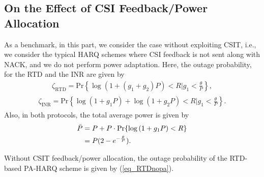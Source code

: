\subsection{On the Effect of CSI Feedback/Power Allocation}
As a benchmark, in this part, we consider the case without exploiting CSIT, i.e., we consider the typical HARQ schemes where CSI feedback is not sent along with NACK, and we do not perform power adaptation.  Here, the outage probability,  for the RTD and the INR  are given by
\begin{align}\label{eq_PrRTD}
    \zeta_{\text{RTD}} = \text{Pr}\left\{\log\left(1+\left(g_1+g_2\right)P\right)<R\Big|g_1<\frac{\theta}{P}  \right\},
\end{align}
\begin{align}\label{eq_PrINR}
\begin{split}
    \zeta_{\text{INR}}=\text{Pr}\left\{\log\left(1+g_1P\right) + \log\left(1+g_2P\right)<R\Big|g_1<\frac{\theta}{P}\right\}.
\end{split}
\end{align}
Also, in both protocols, the total average power is given by
\begin{align}\label{eq_barpbench}
    \Bar{P} &= P + P\cdot\text{Pr}\{\log\left(1+g_1P\right)<R\}\nonumber\\
    &=P(2-e^{-\frac{\theta}{P}}).
\end{align}
\begin{theorem}\label{theorem2}
Without CSIT feedback/power allocation, the outage probability of the RTD-based PA-HARQ scheme is given by (\ref{eq_RTDnopa}).
\end{theorem}
